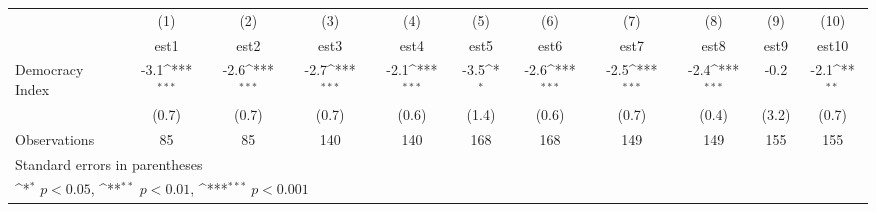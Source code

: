 {
\def\sym#1{\ifmmode^{#1}\else\(^{#1}\)\fi}
\begin{tabular}{l*{10}{c}}
\hline\hline
                    &\multicolumn{1}{c}{(1)}         &\multicolumn{1}{c}{(2)}         &\multicolumn{1}{c}{(3)}         &\multicolumn{1}{c}{(4)}         &\multicolumn{1}{c}{(5)}         &\multicolumn{1}{c}{(6)}         &\multicolumn{1}{c}{(7)}         &\multicolumn{1}{c}{(8)}         &\multicolumn{1}{c}{(9)}         &\multicolumn{1}{c}{(10)}         \\
                    &        est1         &        est2         &        est3         &        est4         &        est5         &        est6         &        est7         &        est8         &        est9         &       est10         \\
\hline
Democracy Index     &        -3.1\sym{***}&        -2.6\sym{***}&        -2.7\sym{***}&        -2.1\sym{***}&        -3.5\sym{*}  &        -2.6\sym{***}&        -2.5\sym{***}&        -2.4\sym{***}&        -0.2         &        -2.1\sym{**} \\
                    &       (0.7)         &       (0.7)         &       (0.7)         &       (0.6)         &       (1.4)         &       (0.6)         &       (0.7)         &       (0.4)         &       (3.2)         &       (0.7)         \\
\hline
Observations        &          85         &          85         &         140         &         140         &         168         &         168         &         149         &         149         &         155         &         155         \\
\hline\hline
\multicolumn{11}{l}{\footnotesize Standard errors in parentheses}\\
\multicolumn{11}{l}{\footnotesize \sym{*} \(p<0.05\), \sym{**} \(p<0.01\), \sym{***} \(p<0.001\)}\\
\end{tabular}
}
